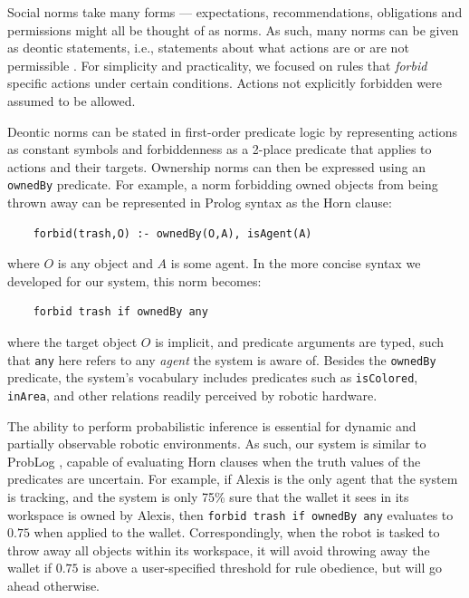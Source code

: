 \documentclass[letterpaper]{article} %
\begin{document}
Social norms take many forms --- expectations, recommendations, obligations and permissions might all be thought of as norms. As such, many norms can be given as deontic statements, i.e., statements about what actions are or are not permissible \cite{malle2017networks}. For simplicity and practicality, we focused on rules that \emph{forbid} specific actions under certain conditions. Actions not explicitly forbidden were assumed to be allowed.

Deontic norms can be stated in first-order predicate logic by representing actions as constant symbols and forbiddenness as a 2-place predicate that applies to actions and their targets. Ownership norms can then be expressed using an \texttt{\small{ownedBy}} predicate. For example, a norm forbidding owned objects from being thrown away can be represented in Prolog syntax as the Horn clause: 
\begin{scriptsize}
\begin{verbatim}
    forbid(trash,O) :- ownedBy(O,A), isAgent(A)
\end{verbatim}
\end{scriptsize}
where $O$ is any object and $A$ is some agent. In the more concise syntax we developed for our system, this norm becomes:
\begin{scriptsize}
\begin{verbatim}
    forbid trash if ownedBy any
\end{verbatim}
\end{scriptsize}
where the target object $O$ is implicit, and predicate arguments are typed, such that \texttt{\small{any}} here refers to any \emph{agent} the system is aware of. Besides the \texttt{\small{ownedBy}} predicate, the system's vocabulary includes predicates such as \texttt{\small{isColored}}, \texttt{\small{inArea}}, and other relations readily perceived by robotic hardware.

The ability to perform probabilistic inference is essential for dynamic and partially observable robotic environments. As such, our system is similar to ProbLog \cite{de2007problog,de2010probabilistic}, capable of evaluating Horn clauses when the truth values of the predicates are uncertain. For example, if Alexis is the only agent that the system is tracking, and the system is only 75\% sure that the wallet it sees in its workspace is owned by Alexis, then \texttt{\small{forbid trash if ownedBy any}} evaluates to $0.75$ when applied to the wallet. Correspondingly, when the robot is tasked to throw away all objects within its workspace, it will avoid throwing away the wallet if $0.75$ is above a user-specified threshold for rule obedience, but will go ahead otherwise.
\end{document}
